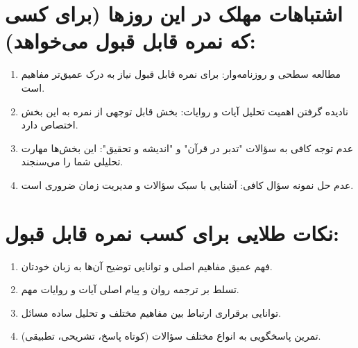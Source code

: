 \documentclass[12pt,a4paper]{article}
\begin{document}
\hrulefill
\section*{اشتباهات مهلک در این روزها (برای کسی که نمره قابل قبول می‌خواهد):}
\begin{enumerate}
    \item مطالعه سطحی و روزنامه‌وار: برای نمره قابل قبول نیاز به درک عمیق‌تر مفاهیم است.
    \item نادیده گرفتن اهمیت تحلیل آیات و روایات: بخش قابل توجهی از نمره به این بخش اختصاص دارد.
    \item عدم توجه کافی به سؤالات "تدبر در قرآن" و "اندیشه و تحقیق": این بخش‌ها مهارت تحلیلی شما را می‌سنجند.
    \item عدم حل نمونه سؤال کافی: آشنایی با سبک سؤالات و مدیریت زمان ضروری است.
\end{enumerate}

\section*{نکات طلایی برای کسب نمره قابل قبول:}
\begin{enumerate}
    \item فهم عمیق مفاهیم اصلی و توانایی توضیح آن‌ها به زبان خودتان.
    \item تسلط بر ترجمه روان و پیام اصلی آیات و روایات مهم.
    \item توانایی برقراری ارتباط بین مفاهیم مختلف و تحلیل ساده مسائل.
    \item تمرین پاسخگویی به انواع مختلف سؤالات (کوتاه پاسخ، تشریحی، تطبیقی).
\end{enumerate}
\end{document}
